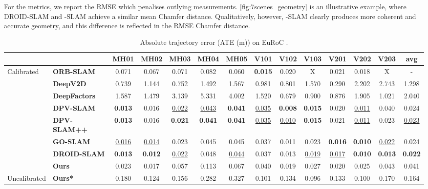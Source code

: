 For the metrics, we report the RMSE which penalises outlying measurements.
\cref{fig:7scenes_geometry} is an illustrative example, where DROID-SLAM and \master-SLAM achieve a similar mean Chamfer distance.  Qualitatively, however, \master-SLAM clearly produces more coherent and accurate geometry, and this difference is reflected in the RMSE Chamfer distance.

\begin{table}[t]\centering
\caption{Absolute trajectory error (ATE (m)) on EuRoC \cite{burri_euroc_2016}.}\label{tab:euroc_ate}
\footnotesize
\begin{tabular}{l|lcccccccccccc} %
& &MH01 &MH02 &MH03 &MH04 &MH05 &V101 &V102 &V103 &V201 &V202 &V203 &avg \\
\hline
\multirow{8}{*}{Calibrated} &\textbf{ORB-SLAM} &0.071 &0.067 &0.071 &0.082 &0.060 &\textbf{0.015} &0.020 &X &0.021 &0.018 &X &- \\
&\textbf{DeepV2D \cite{teed_deepv2d_2020}} &0.739 &1.144 &0.752 &1.492 &1.567 &0.981 &0.801 &1.570 &0.290 &2.202 &2.743 &1.298 \\
&\textbf{DeepFactors \cite{czarnowski_deepfactors_2020}} &1.587 &1.479 &3.139 &5.331 &4.002 &1.520 &0.679 &0.900 &0.876 &1.905 &1.021 &2.040 \\
&\textbf{DPV-SLAM \cite{lipson2024deep}} &\textbf{0.013} &0.016 &\underline{0.022} &\underline{0.043} &\textbf{0.041} &\underline{0.035} &\textbf{0.008} &\textbf{0.015} &0.020 &\underline{0.011} &0.040 &0.024 \\
&\textbf{DPV-SLAM++ \cite{lipson2024deep}} &\textbf{0.013} &0.016 &\textbf{0.021} &\textbf{0.041} &\textbf{0.041} &\underline{0.035} &\underline{0.010} &\textbf{0.015} &0.021 &\underline{0.011} &0.023 &\underline{0.023} \\
&\textbf{GO-SLAM \cite{zhang2023goslam}} &\underline{0.016} &\underline{0.014} &0.023 &0.045 &0.045 &0.037 &0.011 &0.023 &\textbf{0.016} &\textbf{0.010} &\underline{0.022} &0.024 \\
&\textbf{DROID-SLAM \cite{teed_droid_2021}} &\textbf{0.013} &\textbf{0.012} &\underline{0.022} &0.048 &\underline{0.044} &0.037 &0.013 &\underline{0.019} &\underline{0.017} &\textbf{0.010} &\textbf{0.013} &\textbf{0.022} \\
&\textbf{Ours} &0.023 &0.017 &0.057 &0.113 &0.067 &0.040 &0.019 &0.027 &0.020 &0.025 &0.043 &0.041 \\
\hline
Uncalibrated &\textbf{Ours*} &0.180 &0.124 &0.156 &0.282 &0.327 &0.101 &0.134 &0.096 &0.133 &0.100 &0.170 &0.164 \\
\bottomrule
\end{tabular}
\end{table}

